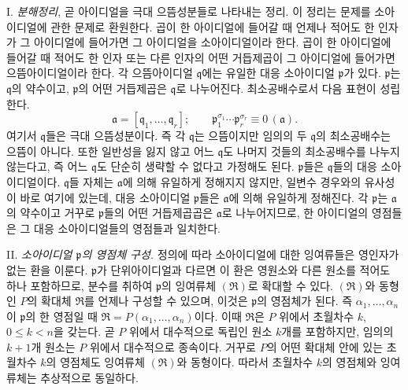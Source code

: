 I. \emph{분해정리}, 곧 아이디얼을 극대 으뜸성분들로 나타내는 정리. 이 정리는 문제를 소아이디얼에 관한 문제로 환원한다. 곱이 한 아이디얼에 들어갈 때 언제나 적어도 한 인자가 그 아이디얼에 들어가면 그 아이디얼을 소아이디얼이라 한다. 곱이 한 아이디얼에 들어갈 때 적어도 한 인자 또는 다른 인자의 어떤 거듭제곱이 그 아이디얼에 들어가면 으뜸아이디얼이라 한다. 각 으뜸아이디얼 \(\mathfrak q\)에는 유일한 대응 소아이디얼 \(\mathfrak p\)가 있다. \(\mathfrak p\)는 \(\mathfrak q\)의 약수이고, \(\mathfrak p\)의 어떤 거듭제곱은 \(\mathfrak q\)로 나누어진다. 최소공배수로서 다음 표현이 성립한다.
\[
\mathfrak a=[\mathfrak q_1,\ldots,\mathfrak q_r];\qquad
\mathfrak p_1^{\sigma_1}\cdots \mathfrak p_r^{\sigma_r}\equiv 0\,(\mathfrak a).
\]
여기서 \(\mathfrak q\)들은 극대 으뜸성분이다. 즉 각 \(\mathfrak q\)는 으뜸이지만 임의의 두 \(\mathfrak q\)의 최소공배수는 으뜸이 아니다. 또한 일반성을 잃지 않고 어느 \(\mathfrak q\)도 나머지 것들의 최소공배수를 나누지 않는다고, 즉 어느 \(\mathfrak q\)도 단순히 생략할 수 없다고 가정해도 된다. \(\mathfrak p\)들은 \(\mathfrak q\)들의 대응 소아이디얼이다. \(\mathfrak q\)들 자체는 \(\mathfrak a\)에 의해 유일하게 정해지지 않지만, 일변수 경우와의 유사성이 바로 여기에 있는데, 대응 소아이디얼 \(\mathfrak p\)들은 \(\mathfrak a\)에 의해 유일하게 정해진다. 각 \(\mathfrak p\)는 \(\mathfrak a\)의 약수이고 거꾸로 \(\mathfrak p\)들의 어떤 거듭제곱곱은 \(\mathfrak a\)로 나누어지므로, 한 아이디얼의 영점들은 그 대응 소아이디얼들의 영점들과 일치한다.

II. \emph{소아이디얼 \(\mathfrak p\)의 영점체 구성.} 정의에 따라 소아이디얼에 대한 잉여류들은 영인자가 없는 환을 이룬다. \(\mathfrak p\)가 단위아이디얼과 다르면 이 환은 영원소와 다른 원소를 적어도 하나 포함하므로, 분수를 취하여 \(\mathfrak p\)의 잉여류체 \((\mathfrak R)\)로 확대할 수 있다. \((\mathfrak R)\)와 동형인 \(P\)의 확대체 \(\mathfrak R\)를 언제나 구성할 수 있으며, 이것은 \(\mathfrak p\)의 영점체가 된다. 즉 \(\alpha_1,\ldots,\alpha_n\)이 \(\mathfrak p\)의 한 영점일 때 \(\mathfrak R=P(\alpha_1,\ldots,\alpha_n)\)이다. 이때 \(\mathfrak R\)은 \(P\) 위에서 초월차수 \(k\), \(0\leq k<n\)을 갖는다. 곧 \(P\) 위에서 대수적으로 독립인 원소 \(k\)개를 포함하지만, 임의의 \(k+1\)개 원소는 \(P\) 위에서 대수적으로 종속이다. 거꾸로 \(P\)의 어떤 확대체 안에 있는 초월차수 \(k\)의 영점체도 잉여류체 \((\mathfrak R)\)와 동형이다. 따라서 초월차수 \(k\)의 영점체와 잉여류체는 추상적으로 동일하다.

